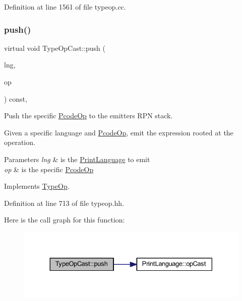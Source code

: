 Definition at line 1561 of file typeop.\+cc.

\mbox{\label{class_type_op_cast_a18ea67d947c8f9c869a6566164590a6d}} 
\subsubsection{\texorpdfstring{push()}{push()}}
{\footnotesize\ttfamily virtual void Type\+Op\+Cast\+::push (\begin{DoxyParamCaption}\item[{\mbox{\hyperlink{class_print_language}{Print\+Language}} $\ast$}]{lng,  }\item[{const \mbox{\hyperlink{class_pcode_op}{Pcode\+Op}} $\ast$}]{op }\end{DoxyParamCaption}) const\hspace{0.3cm}{\ttfamily [inline]}, {\ttfamily [virtual]}}



Push the specific \mbox{\hyperlink{class_pcode_op}{Pcode\+Op}} to the emitter\textquotesingle{}s R\+PN stack. 

Given a specific language and \mbox{\hyperlink{class_pcode_op}{Pcode\+Op}}, emit the expression rooted at the operation. 
\begin{DoxyParams}{Parameters}
{\em lng} & is the \mbox{\hyperlink{class_print_language}{Print\+Language}} to emit \\
\hline
{\em op} & is the specific \mbox{\hyperlink{class_pcode_op}{Pcode\+Op}} \\
\hline
\end{DoxyParams}


Implements \mbox{\hyperlink{class_type_op_ac9c9544203ed74dabe6ac662b653b2af}{Type\+Op}}.



Definition at line 713 of file typeop.\+hh.

Here is the call graph for this function\+:
\nopagebreak
\begin{figure}[H]
\begin{center}
\leavevmode
\includegraphics[width=330pt]{class_type_op_cast_a18ea67d947c8f9c869a6566164590a6d_cgraph}
\end{center}
\end{figure}



